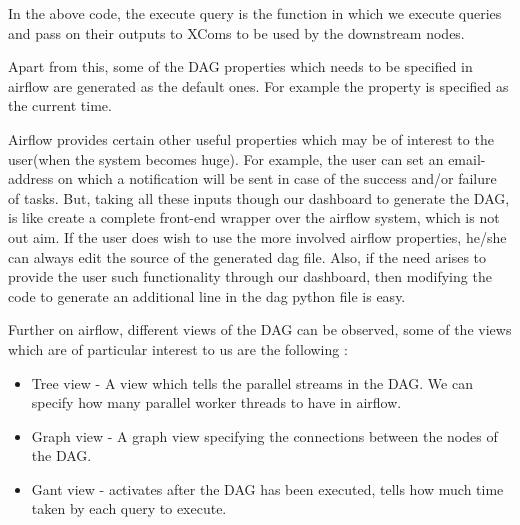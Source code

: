 \documentclass[letterpaper,10pt,english]{sphinxmanual}
\begin{document}
In the above code, the execute query is the function in which we execute queries and pass on their outputs to XComs to be used by the downstream nodes.

%
\begin{sphinxVerbatim}[commandchars=\\\{\}]
\PYG{p}{[}\PYG{p}{]}
\PYG{p}{[}\PYG{p}{]}\PYG{p}{[}\PYG{p}{]}  
\end{sphinxVerbatim}

Apart from this, some of the DAG properties which needs to be specified in airflow are generated as the default ones. For example the  property is specified as the current time.

Airflow provides certain other useful properties which may be of interest to the user(when the system becomes huge). For example, the user can set an email-address on which a notification will be sent in case of the success and/or failure of tasks. But, taking all these inputs though our dashboard to generate the DAG, is like create a complete front-end wrapper over the airflow system, which is not out aim. If the user does wish to use the more involved airflow properties, he/she can always edit the source of the generated dag file. Also, if the need arises to provide the user such functionality through our dashboard, then modifying the code to generate an additional line in the dag python file is easy.

Further on airflow, different views of the DAG can be observed, some of the views which are of particular interest to us are the following :
\begin{itemize}
\item {} 
Tree view - A view which tells the parallel streams in the DAG. We can specify how many parallel worker threads to have in airflow.

\item {} 
Graph view - A graph view specifying the connections between the nodes of the DAG.

\item {} 
Gant view - activates after the DAG has been executed, tells how much time taken by each query to execute.

\end{itemize}
\end{document}
